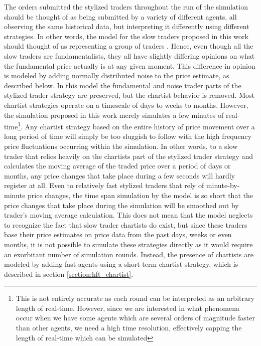  The orders submitted the stylized traders throughout the run of the simulation should be thought of as being submitted by a variety of different agents, all observing the same historical data, but interpreting it differently using different strategies. In other words, the model for the slow traders proposed in this work should thought of as representing a group of traders \cite{drogoul2003multi}. Hence, even though all the slow traders are fundamentalists, they all have slightly differing opinions on what the fundamental price actually is at any given moment. This difference in opinion is modeled by adding normally distributed noise to the price estimate, as described below. In this model the fundamental and noise trader parts of the stylized trader strategy are preserved, but the chartist behavior is removed. Most chartist strategies operate on a timescale of days to weeks to months. However, the simulation proposed in this work merely simulates a few minutes of real-time\footnote{This is not entirely accurate as each round can be interpreted as an arbitrary length of real-time. However, since we are interested in what phenomena occur when we have some agents which are several orders of magnitude faster than other agents, we need a high time resolution, effectively capping the length of real-time which can be simulated}. Any chartist strategy based on the entire history of price movement over a long period of time will simply be too sluggish to follow with the high frequency price fluctuations occurring within the simulation. In other words, to a slow trader that relies heavily on the chartists part of the stylized trader strategy and calculates the moving average of the traded price over a period of days or months, any price changes that take place during a few seconds will hardly register at all. Even to relatively fast stylized traders that rely of minute-by-minute price changes, the time span simulation by the model is so short that the price changes that take place during the simulation will be smoothed out by trader's moving average calculation. This does not mean that the model neglects to recognize the fact that slow trader chartists do exist, but since these traders base their price estimates on price data from the past days, weeks or even months, it is not possible to simulate these strategies directly as it would require an exorbitant number of simulation rounds. Instead, the presence of chartists are modeled by adding fast agents using a short-term chartist strategy, which is described in section \ref{section:hft_chartist}. 
 



